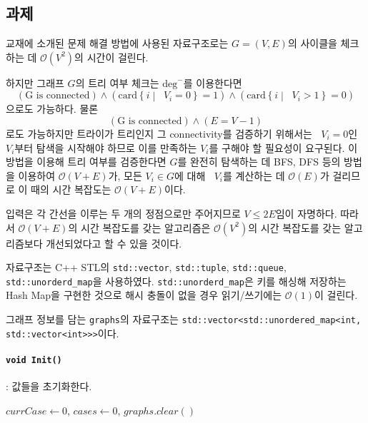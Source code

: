 \subsection{과제}

교재에 소개된 문제 해결 방법에 사용된 자료구조로는 $G=\left(V, E\right)$의 사이클을
체크하는 데 $\mathcal{O}\left(V^2\right)$의 시간이 걸린다.

하지만 그래프 $G$의 트리 여부 체크는 $\mathrm{deg}^-$를 이용한다면
\[\left(\textrm{G is connected}\right) \wedge \left(\mathrm{card}\left\{i \middle| \mathop{\mathrm{deg^-}}V_i = 0\right\} = 1\right) \wedge \left(\mathrm{card}\left\{i \middle| \mathop{\mathrm{deg^-}}V_i > 1\right\} = 0\right)\]
으로도 가능하다. 물론 
\[\left(\textrm{G is connected}\right) \wedge \left(E = V - 1\right)\]
로도 가능하지만 트라이가 트리인지 그 connectivity를 검증하기 위해서는 $\mathop{\mathrm{deg^-}}V_i = 0$인 $V_i$부터 탐색을 시작해야
하므로 이를 만족하는 $V_i$를 구해야 할 필요성이 요구된다. 이 방법을 이용해 트리 여부를 검증한다면
$G$를 완전히 탐색하는 데 BFS, DFS 등의 방법을 이용하여 $\mathcal{O}\left(V + E\right)$가, 모든 $V_i \in G$에 대해 $\mathop{\mathrm{deg^-}}V_i$를
계산하는 데 $\mathcal{O}\left(E\right)$가 걸리므로 이 때의 시간 복잡도는 $\mathcal{O}\left(V + E\right)$이다.

입력은 각 간선을 이루는 두 개의 정점으로만 주어지므로 $V \leq 2E$임이 자명하다. 따라서
$\mathcal{O}\left(V + E\right)$의 시간 복잡도를 갖는 알고리즘은 $\mathcal{O}\left(V^2\right)$의 시간 복잡도를
갖는 알고리즘보다 개선되었다고 할 수 있을 것이다.

자료구조는 C++ STL의 \texttt{std::vector}, \texttt{std::tuple},
\texttt{std::queue}, \texttt{std::unorderd_map}을 사용하였다. \texttt{std::unorderd_map}은
키를 해싱해 저장하는 Hash Map을 구현한 것으로 해시 충돌이 없을 경우 읽기/쓰기에는 $\mathcal{O}\left(1\right)$이 걸린다.

그래프 정보를 담는 \texttt{graphs}의 자료구조는 \texttt{std::vector<std::unordered_map<int, std::vector<int>>>}이다.

\paragraph{\texttt{void Init()}}: 값들을 초기화한다.
\begin{algorithm}
	\item $currCase \leftarrow 0$, $cases \leftarrow 0$, $graphs.clear()$
\end{algorithm}

